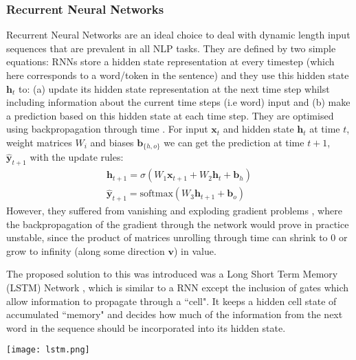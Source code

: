{{\subsubsection{Recurrent Neural Networks}
Recurrent Neural Networks \cite{Elman1990} are an ideal choice to deal with dynamic length input sequences that are prevalent in all NLP tasks. They are defined by two simple equations: RNNs store a hidden state representation at every timestep (which here corresponds to a word/token in the sentence) and they use this hidden state $\mathbf{h}_t$ to: (a) update its hidden state representation at the next time step whilst including information about the current time steps (i.e word) input and (b) make a prediction based on this hidden state at each time step. They are optimised using backpropagation through time \cite{Werbos}. For input $\mathbf{x}_t$ and hidden state $\mathbf{h}_t$ at time $t$, weight matrices $W_i$ and biases $\mathbf{b}_{\{h,o\}}$ we can get the prediction at time $t+1$, $\hat{\mathbf{y}}_{t+1}$ with the update rules:
\begin{align}
\mathbf{h}_{t+1} = \sigma \left(W_1 \mathbf{x}_{t+1} + W_2 \mathbf{h}_t + \mathbf{b}_h \right) \tag{a} \\
\hat{\mathbf{y}}_{t+1} = \text{softmax}\left(W_3 \mathbf{h}_{t+1} + \mathbf{b}_o \right) \tag{b}
\end{align}
 However, they suffered from vanishing and exploding gradient problems \cite{Pascanu}, where the backpropagation of the gradient through the network would prove in practice unstable, since the product of matrices unrolling through time can shrink to 0 or grow to infinity (along some direction $\mathbf{v}$) in value.

The proposed solution to this was introduced was a Long Short Term Memory (LSTM) Network \cite{Hochreiter1997}, which is similar to a RNN except the inclusion of gates which allow information to propagate through a ``cell". It keeps a hidden cell state of accumulated ``memory" and decides how much of the information from the next word in the sequence should be incorporated into its hidden state.

\begin{center}
	\texttt{[image: lstm.png]}
	\label{fig:background:lstm}
\end{center}

}}
